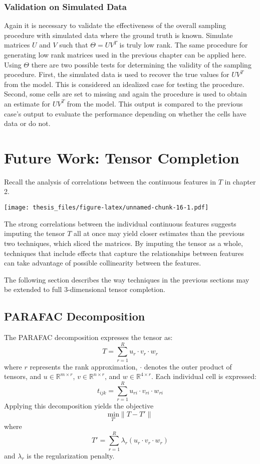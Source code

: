 \documentclass[12pt,twoside]{dukestatscithesis}
\theoremstyle{definition}
\theoremstyle{definition}
\theoremstyle{definition}
\theoremstyle{remark}
\begin{document}
\subsection{Validation on Simulated
Data}\label{validation-on-simulated-data}

Again it is necessary to validate the effectiveness of the overall
sampling procedure with simulated data where the ground truth is known.
Simulate matrices \(U\) and \(V\) such that \(\Theta = UV^T\) is truly
low rank. The same procedure for generating low rank matrices used in
the previous chapter can be applied here. Using \(\Theta\) there are two
possible tests for determining the validity of the sampling procedure.
First, the simulated data is used to recover the true values for
\(UV^T\) from the model. This is considered an idealized case for
testing the procedure. Second, some cells are set to missing and again
the procedure is used to obtain an estimate for \(UV^T\) from the model.
This output is compared to the previous case's output to evaluate the
performance depending on whether the cells have data or do not.

\chapter{Future Work: Tensor
Completion}\label{future-work-tensor-completion}

Recall the analysis of correlations between the continuous features in
\(T\) in chapter 2.

\texttt{[image: thesis\_files/figure-latex/unnamed-chunk-16-1.pdf]}

The strong correlations between the individual continuous features
suggests imputing the tensor \(T\) all at once may yield closer
estimates than the previous two techniques, which sliced the matrices.
By imputing the tensor as a whole, techniques that include effects that
capture the relationships between features can take advantage of
possible collinearity between the features.

The following section describes the way techniques in the previous
sections may be extended to full 3-dimensional tensor completion.

\section{PARAFAC Decomposition}\label{parafac-decomposition}

The PARAFAC decomposition expresses the tensor as:
\[T = \sum_{r=1}^Ru_r \cdotp v_r \cdotp w_r\] where \(r\) represents the
rank approximation, \(\cdotp\) denotes the outer product of tensors, and
\(u \in \mathbb{R}^{m \times r}\), \(v \in \mathbb{R}^{n \times r}\),
and \(w \in \mathbb{R}^{4 \times r}\). Each individual cell is
expressed: \[t_{ijk} = \sum_{r=1}^Ru_{ri} \cdotp v_{ri} \cdotp w_{ri}\]
Applying this decomposition yields the objective
\[\underset{T'} {\text{min}}\|T-T'\|\] where
\[T' = \sum_{r=1}^R\lambda_r(u_r \cdotp v_r \cdotp w_r)\] and
\(\lambda_r\) is the regularization penalty.
\end{document}
